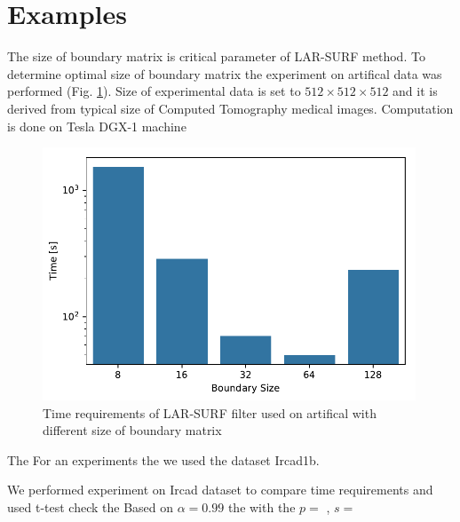\section{Examples}\label{sec:examples}


The size of boundary matrix is critical parameter of LAR-SURF method. To determine optimal size of boundary matrix the experiment on artifical data was performed (Fig.  \ref{fig:bm_size_tesla}). Size of experimental data is set to $512\times512\times512$ and it is derived from typical size of Computed Tomography medical images. Computation is done on Tesla DGX-1 machine

\begin{figure}
\includegraphics[width=0.99\textwidth]{figs/bm_size_tesla.pdf} 
\caption{Time requirements of LAR-SURF filter used on artifical with different size of boundary matrix}
\label{fig:bm_size_tesla}
\end{figure}

The 
For an experiments the we used the dataset Ircad1b. 

\begin{table}

\end{table}
\begin{table}

\end{table}


We performed experiment on Ircad dataset to compare time requirements and used t-test  check the  Based on $\alpha=0.99$ the with the $p=$ , 
$s=$


